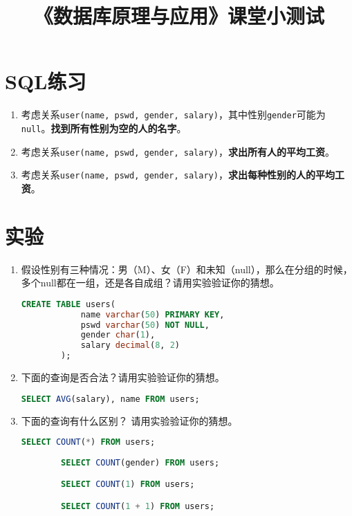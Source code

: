 \documentclass{article}
\title{《数据库原理与应用》课堂小测试}
\begin{document}
\maketitle

\section{SQL练习}

\begin{enumerate}
    \item 考虑关系\texttt{user(name, pswd, gender, salary)}，其中性别\texttt{gender}可能为\texttt{null}。\textbf{找到所有性别为空的人的名字}。
    \item 考虑关系\texttt{user(name, pswd, gender, salary)}，\textbf{求出所有人的平均工资}。
    \item 考虑关系\texttt{user(name, pswd, gender, salary)}，\textbf{求出每种性别的人的平均工资}。
\end{enumerate}

\section{实验}
\begin{enumerate}
    \item 假设性别有三种情况：男（M）、女（F）和未知（null），那么在分组的时候，多个null都在一组，还是各自成组？请用实验验证你的猜想。

    \begin{lstlisting}[language=SQL]
        CREATE TABLE users(
            name varchar(50) PRIMARY KEY,
            pswd varchar(50) NOT NULL,
            gender char(1),
            salary decimal(8, 2)
        );
    \end{lstlisting}
    \item 下面的查询是否合法？请用实验验证你的猜想。
    \begin{lstlisting}[language=SQL]
        SELECT AVG(salary), name FROM users;
    \end{lstlisting}  
    \item 下面的查询有什么区别？ 请用实验验证你的猜想。
    \begin{lstlisting}[language=SQL]
        SELECT COUNT(*) FROM users;
        
        SELECT COUNT(gender) FROM users;

        SELECT COUNT(1) FROM users;

        SELECT COUNT(1 + 1) FROM users;
    \end{lstlisting} 
\end{enumerate}
\end{document}
